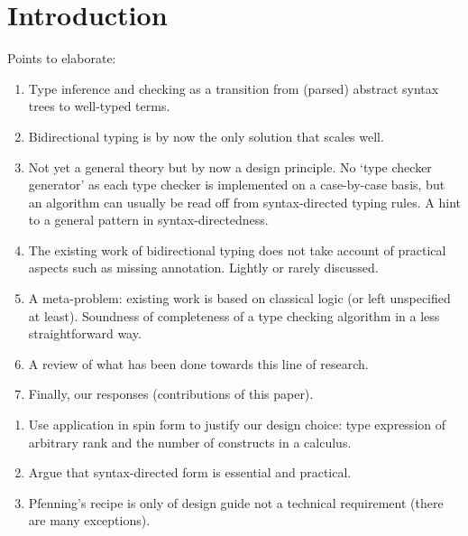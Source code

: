 
\section{Introduction}\label{sec:intro}


Points to elaborate:
\begin{enumerate}
  \item Type inference and checking as a transition from (parsed) abstract syntax trees to well-typed terms.
  \item Bidirectional typing is by now the only solution that scales well.
  \item Not yet a general theory but by now a design principle.
    No `type checker generator' as each type checker is implemented on a case-by-case basis, but an algorithm can usually be read off from syntax-directed typing rules.
    A hint to a general pattern in syntax-directedness.
  \item The existing work of bidirectional typing does not take account of practical aspects such as missing annotation.
    Lightly or rarely discussed.
  \item A meta-problem: existing work is based on classical logic (or left unspecified at least).
    Soundness of completeness of a type checking algorithm in a less straightforward way.
  \item A review of what has been done towards this line of research.
  \item Finally, our responses (contributions of this paper).
\end{enumerate}


\begin{enumerate}
  \item Use application in spin form to justify our design choice: type expression of arbitrary rank and the number of constructs in a calculus.
  \item Argue that syntax-directed form is essential and practical.
  \item Pfenning's recipe is only of design guide not a technical requirement (there are many exceptions).
\end{enumerate}

